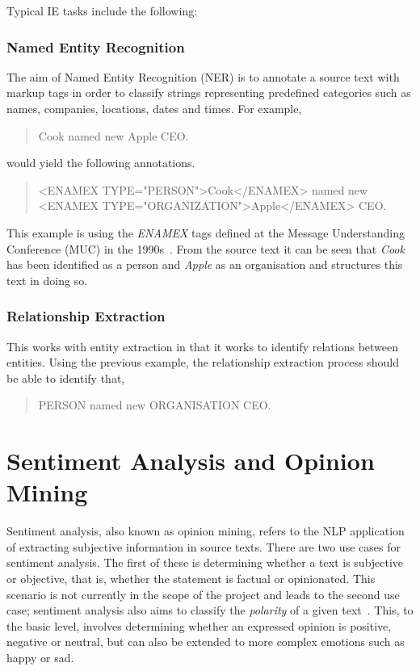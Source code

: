 Typical IE tasks include the following:

\subsubsection{Named Entity Recognition}
The aim of Named Entity Recognition (NER) is to annotate a source text with markup tags in order to classify strings representing predefined categories such as names, companies, locations, dates and times. For example,
\begin{quote}
Cook named new Apple CEO.
\end{quote}
would yield the following annotations.
\begin{quote}
<ENAMEX TYPE="PERSON">Cook</ENAMEX> named new
\newline
<ENAMEX TYPE="ORGANIZATION">Apple</ENAMEX> CEO.
\end{quote}

This example is using the \emph{ENAMEX} tags defined at the Message Understanding Conference (MUC) in the 1990s~\cite{grishman96muc}. From the source text it can be seen that \emph{Cook} has been identified as a person and \emph{Apple} as an organisation and structures this text in doing so.

\subsubsection{Relationship Extraction}
This works with entity extraction in that it works to identify relations between entities. Using the previous example, the relationship extraction process should be able to identify that,
\begin{quote}
PERSON named new ORGANISATION CEO.
\end{quote}


\section[Sentiment Analysis]{Sentiment Analysis and Opinion Mining}
\label{sec:back_sent}
Sentiment analysis, also known as opinion mining, refers to the NLP application of extracting subjective information in source texts. There are two use cases for sentiment analysis. The first of these is determining whether a text is subjective or objective, that is, whether the statement is factual or opinionated. This scenario is not currently in the scope of the project and leads to the second use case; sentiment analysis also aims to classify the \emph{polarity} of a given text~\cite{Pang+Lee}. This, to the basic level, involves determining whether an expressed opinion is positive, negative or neutral, but can also be extended to more complex emotions such as happy or sad.

